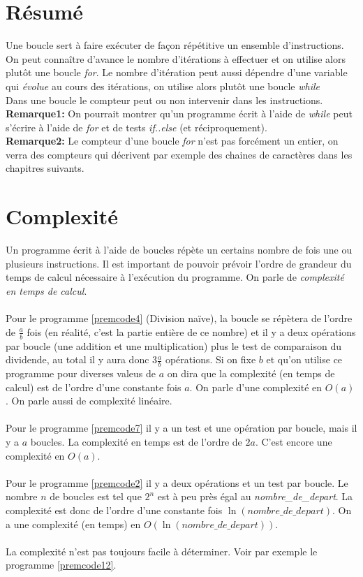 \section{Résumé}
Une boucle sert à faire exécuter de façon répétitive un ensemble d'instructions.
On peut connaître d'avance le nombre d'itérations à effectuer et on utilise alors plutôt une boucle \textit{for}. 
Le nombre d'itération peut aussi dépendre d'une variable qui \textit{évolue} au cours des itérations, on utilise alors plutôt une boucle \textit{while}\\
Dans une boucle le compteur peut ou non intervenir dans les instructions.\\

\textbf{Remarque1:}
On pourrait montrer qu'un programme écrit à l'aide de \textit{while} peut s'écrire à l'aide de \textit{for} et de tests \textit{if..else} (et réciproquement).\\

\textbf{Remarque2:}
Le compteur d'une boucle \textit{for} n'est pas forcément un entier, on verra des compteurs qui décrivent par exemple des chaines de caractères dans les chapitres suivants.

\section{Complexité}
Un programme écrit à l'aide de boucles répète un certains nombre de fois une ou plusieurs instructions. Il est important de pouvoir prévoir l'ordre de grandeur du temps de calcul nécessaire à l'exécution du programme. On parle de \textit{complexité en temps de calcul}.\\
\\
Pour le programme \ref{premcode4} (Division naïve), la boucle se répètera de l'ordre de $\frac{a}{b}$ fois (en réalité, c'est la partie entière de ce nombre) et il y a deux opérations par boucle (une addition et une multiplication) plus le test de comparaison du dividende, au total il y aura donc $3\frac{a}{b}$ opérations. Si on fixe $b$ et qu'on utilise ce programme pour diverses valeus de $a$ on dira que la complexité (en temps de calcul) est de l'ordre d'une constante fois $a$. On parle d'une complexité en $O(a)$. On parle aussi de complexité linéaire.\\
\\
Pour le programme \ref{premcode7} il y a un test et une opération par boucle, mais il y a $a$ boucles. La complexité en temps est de l'ordre de $2a$. C'est encore une complexité en $O(a)$. \\
\\
Pour le programme \ref{premcode2} il y a deux opérations et un test par boucle. Le nombre $n$ de boucles est tel que $2^n$ est à peu près égal au \textit{nombre\_de\_depart}. La complexité est donc de l'ordre d'une constante fois $\ln(nombre\_de\_depart)$. On a une complexité (en temps) en $O(\ln(nombre\_de\_depart))$.\\
\\
La complexité n'est pas toujours facile à déterminer. Voir par exemple le programme \ref{premcode12}. 
    

